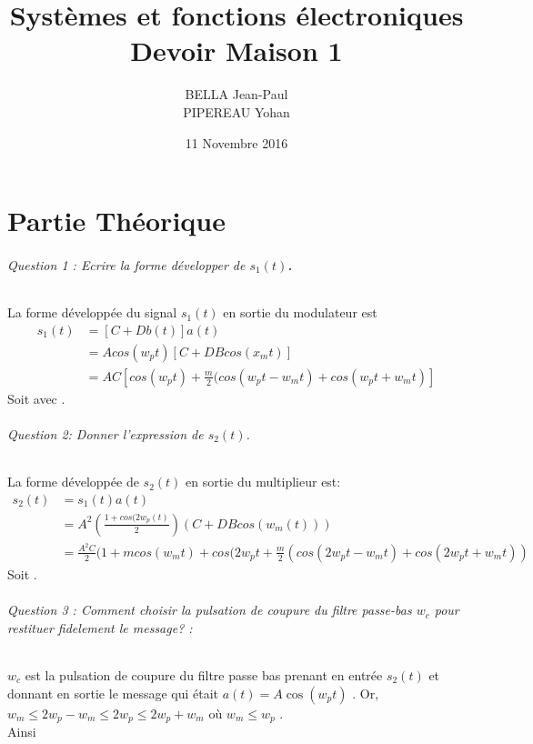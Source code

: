 \documentclass[french, a4paper,12pt, titlepage]{article}
\title{ {Systèmes et fonctions électroniques} \\ Devoir Maison 1}
\date{11 Novembre 2016}
\author{BELLA Jean-Paul \\ PIPEREAU Yohan}
\begin{document}
\maketitle

\newpage

\part*{\textbf{Partie Théorique}}


\paragraph{Question 1 : Ecrire la forme développer de \textbf{$s_1(t)$.} \\}
La forme développée du signal $s_1(t)$ en sortie du modulateur est
\begin{align*}
	s_{1}(t) & =  [ C + Db(t) ] a(t) \\
	& =  A cos(w_{p}t) [ C + DBcos(x_{m}t)]\\
	& =  AC [ cos(w_{p}t) +   \frac{m}{2}(cos(w_{p}t-w_{m}t) + cos(w_{p}t+w_{m}t) ]
\end{align*}
Soit  avec .\\


\paragraph{Question 2: Donner l'expression de $s_2(t)$. \\}
La forme développée de $s_2(t)$ en sortie du multiplieur est:
\begin{align*}
	s_{2}(t) & = s_{1}(t) a(t) \\
	&= A^{2} ( \frac{1+cos(2w_{p}(t)}{2} ) ( C + DBcos(w_{m}(t)) ) \\
	&=\frac{A^{2}C}{2} (1 + mcos(w_{m}t) + cos(2w_{p}t + \frac{m}{2} (cos (2w_{p}t-w_{m}t) + cos(2w_{p}t + w_{m}t) )
\end{align*}
Soit .

\paragraph{Question 3 : Comment choisir la pulsation de coupure du filtre passe-bas $w_{c}$ pour restituer fidelement le message? : \\ }
$w_{c}$  est la pulsation de coupure du filtre passe bas prenant en entrée  $s_{2}(t)$
et donnant en sortie le message qui était  $a(t)=A\cos(w_{p}t)$ .
Or,  $w_{m} \leq 2w_{p}-w_{m} \leq 2w_{p} \leq 2w_{p} + w_{m}$  où  $w_{m} \leq w_{p}$ . \\
Ainsi  \\
\end{document}
